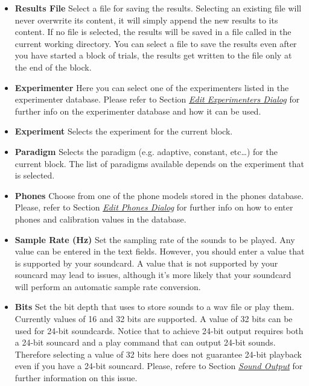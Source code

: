 \documentclass[a4paper,12pt,english]{sphinxmanual}
\begin{document}
\begin{itemize}
\item {} 
\textbf{Results File} Select a file for saving the results. Selecting an
existing file will never overwrite its content, it will simply append
the new results to its content. If no file is selected, the results
will be saved in a file called  in the current working
directory. You can select a file to save the results even after you
have started a block of trials, the results get written to the file
only at the end of the block.

\item {} 
\textbf{Experimenter} Here you can select one of the experimenters listed
in the experimenter database. Please refer to
Section {\hyperref[graphical_user_interface:sec-edit-experimenters-dia]{\emph{Edit Experimenters Dialog}}} for further info on the
experimenter database and how it can be used.

\item {} 
\textbf{Experiment} Selects the experiment for the current block.

\item {} 
\textbf{Paradigm} Selects the paradigm (e.g. adaptive, constant, etc…) for
the current block. The list of paradigms available depends on the
experiment that is selected.

\item {} 
\textbf{Phones} Choose from one of the phone models stored in the phones
database. Please, refer to Section {\hyperref[graphical_user_interface:sec-edit-phones-dia]{\emph{Edit Phones Dialog}}} for
further info on how to enter phones and calibration values in the
database.

\item {} 
\textbf{Sample Rate (Hz)} Set the sampling rate of the sounds to be
played. Any value can be entered in the text fields. However, you
should enter a value that is supported by your soundcard. A value
that is not supported by your souncard may lead to issues, although
it’s more likely that your soundcard will perform an automatic sample
rate conversion.

\item {} 
\textbf{Bits} Set the bit depth that  uses to store
sounds to a wav file or play them. Currently values of 16 and 32 bits
are supported. A value of 32 bits can be used for 24-bit soundcards.
Notice that to achieve 24-bit output requires both a 24-bit souncard
and a play command that can output 24-bit sounds. Therefore selecting
a value of 32 bits here does not guarantee 24-bit playback even if
you have a 24-bit souncard. Please, refere to
Section {\hyperref[engine:sec-sound-output]{\emph{Sound Output}}} for further information on this
issue.


\end{itemize}
\end{document}

